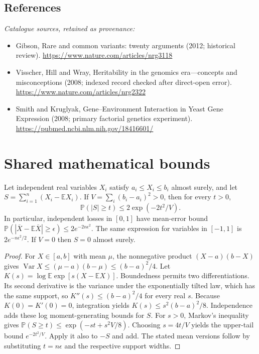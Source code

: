 \documentclass[11pt]{article}
\begin{document}
\subsection{References}
\noindent\emph{Catalogue sources, retained as provenance:}
\begin{itemize}
\item Gibson, Rare and common variants: twenty arguments (2012; historical review). \url{https://www.nature.com/articles/nrg3118}
\item Visscher, Hill and Wray, Heritability in the genomics era---concepts and misconceptions (2008; indexed record checked after direct-open error). \url{https://www.nature.com/articles/nrg2322}
\item Smith and Kruglyak, Gene--Environment Interaction in Yeast Gene Expression (2008; primary factorial genetics experiment). \url{https://pubmed.ncbi.nlm.nih.gov/18416601/}
\end{itemize}




\section{Shared mathematical bounds}\label{app:bounds}
\begin{lemma}\label{lem:bounded}
Let independent real variables $X_i$ satisfy $a_i\leq X_i\leq b_i$ almost surely,
and let $S=\sum_{i=1}^n(X_i-\mathbb{E} X_i)$. If
$V=\sum_i(b_i-a_i)^2>0$, then for every $t>0$,
\[
 \mathbb{P}(|S|\geq t)\leq 2\exp(-2t^2/V).
\]
In particular, independent losses in $[0,1]$ have mean-error bound
$\mathbb{P}(|\overline X-\mathbb{E}\overline X|\geq\epsilon)
\leq2e^{-2n\epsilon^2}$. The same expression for variables in $[-1,1]$
is $2e^{-n\epsilon^2/2}$. If $V=0$ then $S=0$ almost surely.
\end{lemma}
\begin{proof}
For $X\in[a,b]$ with mean $\mu$, the nonnegative product
$(X-a)(b-X)$ gives
$\operatorname{Var} X\leq(\mu-a)(b-\mu)\leq(b-a)^2/4$.
Let $K(s)=\log\mathbb{E}\exp[s(X-\mathbb{E} X)]$.
Boundedness permits two differentiations. Its second derivative is the variance
under the exponentially tilted law, which has the same support, so
$K''(s)\leq(b-a)^2/4$ for every real $s$.
Because $K(0)=K'(0)=0$, integration yields
$K(s)\leq s^2(b-a)^2/8$.
Independence adds these log moment-generating bounds for $S$.
For $s>0$, Markov's inequality gives
$\mathbb{P}(S\geq t)\leq\exp(-st+s^2V/8)$.
Choosing $s=4t/V$ yields the upper-tail bound $e^{-2t^2/V}$.
Apply it also to $-S$ and add. The stated mean versions follow by substituting
$t=n\epsilon$ and the respective support widths.
\end{proof}
\end{document}

